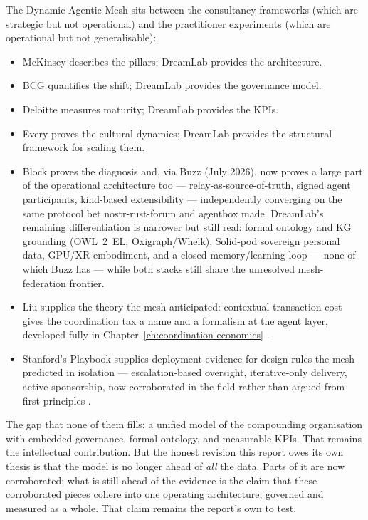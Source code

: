 \begin{keyinsight}[title={The Positioning Opportunity}]
The Dynamic Agentic Mesh sits between the consultancy frameworks (which are strategic but not operational) and the practitioner experiments (which are operational but not generalisable):
\begin{itemize}
  \item McKinsey describes the pillars; DreamLab provides the architecture.
  \item BCG quantifies the shift; DreamLab provides the governance model.
  \item Deloitte measures maturity; DreamLab provides the KPIs.
  \item Every proves the cultural dynamics; DreamLab provides the structural framework for scaling them.
  \item Block proves the diagnosis and, via Buzz (July 2026), now proves a large part of the operational architecture too --- relay-as-source-of-truth, signed agent participants, kind-based extensibility --- independently converging on the same protocol bet nostr-rust-forum and agentbox made. DreamLab's remaining differentiation is narrower but still real: formal ontology and KG grounding (OWL~2~EL, Oxigraph/Whelk), Solid-pod sovereign personal data, GPU/XR embodiment, and a closed memory/learning loop --- none of which Buzz has --- while both stacks still share the unresolved mesh-federation frontier.
  \item Liu supplies the theory the mesh anticipated: contextual transaction cost gives the coordination tax a name and a formalism at the agent layer, developed fully in Chapter~\ref{ch:coordination-economics} \parencite{Liu2026}.
  \item Stanford's Playbook supplies deployment evidence for design rules the mesh predicted in isolation --- escalation-based oversight, iterative-only delivery, active sponsorship, now corroborated in the field rather than argued from first principles \parencite{Pereira2026Playbook}.
\end{itemize}

The gap that none of them fills: a unified model of the compounding organisation with embedded governance, formal ontology, and measurable KPIs. That remains the intellectual contribution. But the honest revision this report owes its own thesis is that the model is no longer ahead of \emph{all} the data. Parts of it are now corroborated; what is still ahead of the evidence is the claim that these corroborated pieces cohere into one operating architecture, governed and measured as a whole. That claim remains the report's own to test.
\end{keyinsight}
